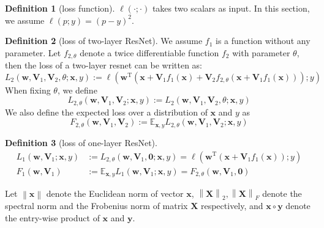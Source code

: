 \documentclass{article}
\theoremstyle{plain}
\theoremstyle{definition}
\newtheorem{defn}{Definition}
\newcommand{\norm}[1]{\left\lVert#1\right\rVert}
\begin{document}
\begin{defn}[loss function]
    $\ell(\cdot;\cdot)$ takes two scalars as input. In this section, we assume $\ell(p;y)=(p-y)^2$.
\end{defn}

\begin{defn}[loss of two-layer ResNet]
	We assume $f_1$ is a function without any parameter. Let $f_{2,\theta}$ denote a twice differentiable function $f_2$ with parameter $\theta$, then the loss of a two-layer resnet can be written as:
    \[L_2(\mathbf{w},\mathbf{V}_1,\mathbf{V}_2,\theta;\mathbf{x},y):=\ell\left(\mathbf{w}^\mathrm{T}(\mathbf{x}+\mathbf{V}_1f_1(\mathbf{x})+\mathbf{V}_2f_{2,\theta}(\mathbf{x}+\mathbf{V}_1f_1(\mathbf{x})));y\right)\]
	When fixing $\theta$, we define
	\[L_{2,\theta}(\mathbf{w},\mathbf{V}_1,\mathbf{V}_2;\mathbf{x},y):=L_2(\mathbf{w},\mathbf{V}_1,\mathbf{V}_2,\theta;\mathbf{x},y)\]
	We also define the expected loss over a distribution of $\mathbf{x}$ and $y$ as
	\[F_{2,\theta}(\mathbf{w},\mathbf{V}_1,\mathbf{V}_2):=\mathbb{E}_{\mathbf{x},y}L_{2,\theta}(\mathbf{w},\mathbf{V}_1,\mathbf{V}_2;\mathbf{x},y)\]
\end{defn}

\begin{defn}[loss of one-layer ResNet]
	\begin{align*}
        L_1(\mathbf{w},\mathbf{V}_1;\mathbf{x},y)&:=L_{2,\theta}(\mathbf{w},\mathbf{V}_1,\mathbf{0};\mathbf{x},y)=\ell\left(\mathbf{w}^\mathrm{T}(\mathbf{x}+\mathbf{V}_1f_1(\mathbf{x}));y\right)\\
	F_1(\mathbf{w},\mathbf{V}_1)&:=\mathbb{E}_{\mathbf{x},y}L_1(\mathbf{w},\mathbf{V}_1;\mathbf{x},y)=F_{2,\theta}(\mathbf{w},\mathbf{V}_1,\mathbf{0})
	\end{align*}
\end{defn}

\begin{flushleft}
	Let $\norm{\mathbf{x}}$ denote the Euclidean norm of vector $\mathbf{x}$, $\norm{\mathbf{X}}_2,\norm{\mathbf{X}}_F$ denote the spectral norm and the Frobenius norm of matrix $\mathbf{X}$ respectively, and $\mathbf{x}\circ\mathbf{y}$ denote the entry-wise product of $\mathbf{x}$ and $\mathbf{y}$.
\end{flushleft}
\end{document}
